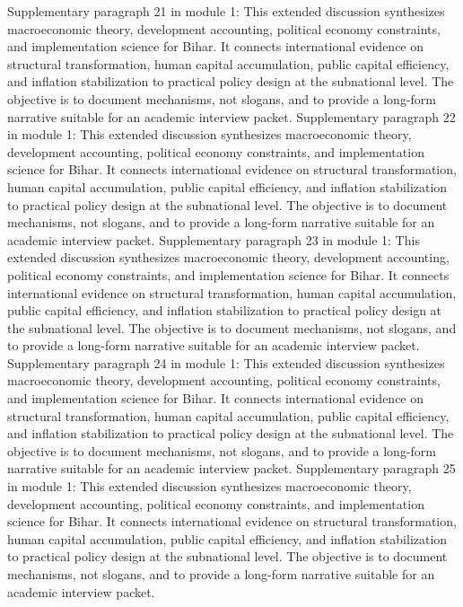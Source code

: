 \documentclass[preprint,12pt]{elsarticle}
\begin{document}
Supplementary paragraph 21 in module 1: This extended discussion synthesizes macroeconomic theory, development accounting, political economy constraints, and implementation science for Bihar. It connects international evidence on structural transformation, human capital accumulation, public capital efficiency, and inflation stabilization to practical policy design at the subnational level. The objective is to document mechanisms, not slogans, and to provide a long-form narrative suitable for an academic interview packet.
Supplementary paragraph 22 in module 1: This extended discussion synthesizes macroeconomic theory, development accounting, political economy constraints, and implementation science for Bihar. It connects international evidence on structural transformation, human capital accumulation, public capital efficiency, and inflation stabilization to practical policy design at the subnational level. The objective is to document mechanisms, not slogans, and to provide a long-form narrative suitable for an academic interview packet.
Supplementary paragraph 23 in module 1: This extended discussion synthesizes macroeconomic theory, development accounting, political economy constraints, and implementation science for Bihar. It connects international evidence on structural transformation, human capital accumulation, public capital efficiency, and inflation stabilization to practical policy design at the subnational level. The objective is to document mechanisms, not slogans, and to provide a long-form narrative suitable for an academic interview packet.
Supplementary paragraph 24 in module 1: This extended discussion synthesizes macroeconomic theory, development accounting, political economy constraints, and implementation science for Bihar. It connects international evidence on structural transformation, human capital accumulation, public capital efficiency, and inflation stabilization to practical policy design at the subnational level. The objective is to document mechanisms, not slogans, and to provide a long-form narrative suitable for an academic interview packet.
Supplementary paragraph 25 in module 1: This extended discussion synthesizes macroeconomic theory, development accounting, political economy constraints, and implementation science for Bihar. It connects international evidence on structural transformation, human capital accumulation, public capital efficiency, and inflation stabilization to practical policy design at the subnational level. The objective is to document mechanisms, not slogans, and to provide a long-form narrative suitable for an academic interview packet.
\end{document}
